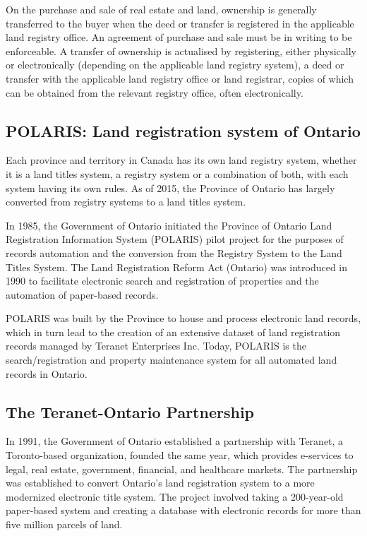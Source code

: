On the purchase and sale of real estate and land, ownership is generally transferred to the buyer when the deed or transfer is registered in the applicable land registry office.
An agreement of purchase and sale must be in writing to be enforceable.
A transfer of ownership is actualised by registering, either physically or electronically (depending on the applicable land registry system), a deed or transfer with the applicable land registry office or land registrar, copies of which can be obtained from the relevant registry office, often electronically.

\subsection{POLARIS: Land registration system of Ontario} \label{subsec:lang_reg_operating_canada}

Each province and territory in Canada has its own land registry system, whether it is a land titles system, a registry system or a combination of both, with each system having its own rules.
As of 2015, the Province of Ontario has largely converted from registry systems to a land titles system.

In 1985, the Government of Ontario initiated the Province of Ontario Land Registration Information System (POLARIS) pilot project for the purposes of records automation and the conversion from the Registry System to the Land Titles System.
The Land Registration Reform Act (Ontario)\cite{TheGovernmentofOntario1990} was introduced in 1990 to facilitate electronic search and registration of properties and the automation of paper-based records.

POLARIS was built by the Province to house and process electronic land records, which in turn lead to the creation of an extensive dataset of land registration records managed by Teranet Enterprises Inc.
Today, POLARIS is the search/registration and property maintenance system for all automated land records in Ontario.

\subsection{The Teranet-Ontario Partnership} \label{subsec:teranet_ontario}

In 1991, the Government of Ontario established a partnership with Teranet\cite{TeranetEnterprisesInc.2019}, a Toronto-based organization, founded the same year, which provides e-services to legal, real estate, government, financial, and healthcare markets.
The partnership was established to convert Ontario's land registration system to a more modernized electronic title system.
The project involved taking a 200-year-old paper-based system and creating a database with electronic records for more than five million parcels of land.

